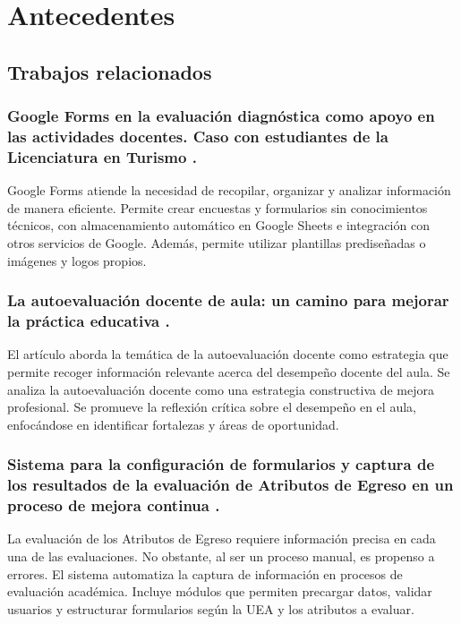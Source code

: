 \section{Antecedentes}\label{sec:antecedentes}
\justifying

\subsection{Trabajos relacionados}

\subsubsection{Google Forms en la evaluación diagnóstica como apoyo en las actividades docentes. Caso con estudiantes de la Licenciatura en Turismo \cite{leyva2018google}.}

Google Forms atiende la necesidad de recopilar, organizar y analizar información de manera eficiente. Permite crear encuestas y formularios sin conocimientos técnicos, con almacenamiento automático en Google Sheets e integración con otros servicios de Google. Además, permite utilizar plantillas prediseñadas o imágenes y logos propios.


\subsubsection{La autoevaluación docente de aula: un camino para mejorar la práctica educativa \cite{echeverria2011autoevaluacion}.}

El artículo aborda la temática de la autoevaluación docente como estrategia que permite recoger información relevante acerca del desempeño docente del aula. Se analiza la autoevaluación docente como una estrategia constructiva de mejora profesional. Se promueve la reflexión crítica sobre el desempeño en el aula, enfocándose en identificar fortalezas y áreas de oportunidad.

\subsubsection{Sistema para la configuración de formularios y captura de los resultados de la evaluación de Atributos de Egreso en un proceso de mejora continua \cite{Cuautle2022}.}

 La evaluación de los Atributos de Egreso requiere información precisa en cada una de las evaluaciones. No obstante, al ser un proceso manual, es propenso a errores. El sistema automatiza la captura de información en procesos de evaluación académica. Incluye módulos que permiten precargar datos, validar usuarios y estructurar formularios según la UEA y los atributos a evaluar.

